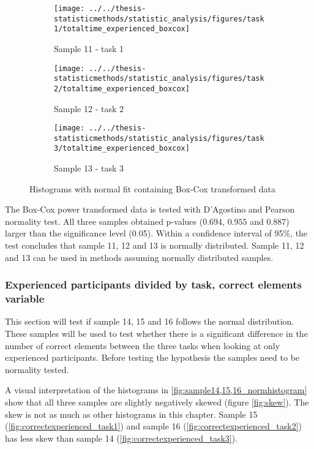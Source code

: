 \begin{figure}[H]
	\centering
	\begin{subfigure}[b]{0.32\textwidth}
		\centering
		\texttt{[image: ../../thesis-statisticmethods/statistic\_analysis/figures/task1/totaltime\_experienced\_boxcox]}
		\caption{Sample 11 - task 1}
		\label{fig:totaltimeexperiencedboxcox_task1}
	\end{subfigure}
	\begin{subfigure}[b]{0.32\textwidth}
		\centering
		\texttt{[image: ../../thesis-statisticmethods/statistic\_analysis/figures/task2/totaltime\_experienced\_boxcox]}
		\caption{Sample 12 - task 2}
		\label{fig:totaltimeexperiencedboxcox_task2}
	\end{subfigure}
	\begin{subfigure}[b]{0.32\textwidth}
		\centering
		\texttt{[image: ../../thesis-statisticmethods/statistic\_analysis/figures/task3/totaltime\_experienced\_boxcox]}
		\caption{Sample 13 - task 3}
		\label{fig:totaltimeexperiencedboxcox_task3}
	\end{subfigure}
	\caption{Histograms with normal fit containing Box-Cox transformed data}
	\label{fig:sample11_12_13_boxcox_histogram}
\end{figure}

The Box-Cox power transformed data is tested with D'Agostino and Pearson normality test. All three samples obtained p-values ($0.694$, $0.955$ and $0.887$) larger than the significance level (0.05). Within a confidence interval of 95\%, the test concludes that sample 11, 12 and 13 is normally distributed. Sample 11, 12 and 13 can be used in methods assuming normally distributed samples. 

\subsubsection[Sample 14, 15 and 16]{Experienced participants divided by task, correct elements variable}
This section will test if sample 14, 15 and 16 follows the normal distribution. These samples will be used to test whether there is a significant difference in the number of correct elements between the three tasks when looking at only experienced participants. Before testing the hypothesis the samples need to be normality tested. 

A visual interpretation of the histograms in \ref{fig:sample14,15,16_normhistogram} show that all three samples are slightly negatively skewed (figure \ref{fig:skew}). The skew is not as much as other histograms in this chapter. Sample 15 (\ref{fig:correctexperienced_task1}) and sample 16 (\ref{fig:correctexperienced_task2}) has less skew than sample 14 (\ref{fig:correctexperienced_task3}).  

